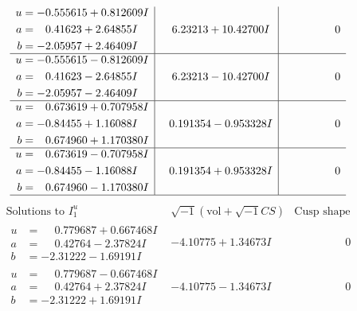 \documentclass[1p]{elsarticle_modified}
\theoremstyle{definition}
\newcommand{\I}{\sqrt{-1}}
\begin{document}
$$\begin{array}{c|c|c}
\begin{aligned}
u &= -0.555615 + 0.812609 I \\
a &= \phantom{-}0.41623 + 2.64855 I \\
b &= -2.05957 + 2.46409 I\end{aligned}
 & \phantom{-}6.23213 + 10.42700 I & \phantom{-0.000000 } 0 \\ \hline\begin{aligned}
u &= -0.555615 - 0.812609 I \\
a &= \phantom{-}0.41623 - 2.64855 I \\
b &= -2.05957 - 2.46409 I\end{aligned}
 & \phantom{-}6.23213 - 10.42700 I & \phantom{-0.000000 } 0 \\ \hline\begin{aligned}
u &= \phantom{-}0.673619 + 0.707958 I \\
a &= -0.84455 + 1.16088 I \\
b &= \phantom{-}0.674960 + 1.170380 I\end{aligned}
 & \phantom{-}0.191354 - 0.953328 I & \phantom{-0.000000 } 0 \\ \hline\begin{aligned}
u &= \phantom{-}0.673619 - 0.707958 I \\
a &= -0.84455 - 1.16088 I \\
b &= \phantom{-}0.674960 - 1.170380 I\end{aligned}
 & \phantom{-}0.191354 + 0.953328 I & \phantom{-0.000000 } 0\\
 \hline 
 \end{array}$$\newpage$$\begin{array}{c|c|c}  
\text{Solutions to }I^u_{1}& \I (\text{vol} + \sqrt{-1}CS) & \text{Cusp shape}\\
 \hline 
\begin{aligned}
u &= \phantom{-}0.779687 + 0.667468 I \\
a &= \phantom{-}0.42764 - 2.37824 I \\
b &= -2.31222 - 1.69191 I\end{aligned}
 & -4.10775 + 1.34673 I & \phantom{-0.000000 } 0 \\ \hline\begin{aligned}
u &= \phantom{-}0.779687 - 0.667468 I \\
a &= \phantom{-}0.42764 + 2.37824 I \\
b &= -2.31222 + 1.69191 I\end{aligned}
 & -4.10775 - 1.34673 I & \phantom{-0.000000 } 0 \\ \hline\begin{aligned}

\end{aligned}
\end{array}$$
\end{document}
